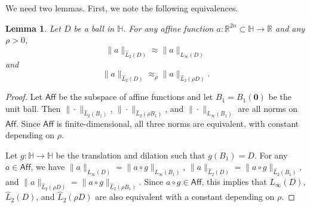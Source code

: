 \documentclass[12pt,reqno]{amsart}
\newcommand{\Aff}{\mathsf{Aff}}
\newcommand{\HH}{\mathbb{H}}
\newcommand{\R}{\mathbb{R}}
\newcommand{\zero}{\mathbf{0}}
\newcommand{\from}{\colon}
\newtheorem{lemma}[thm]{Lemma}
\theoremstyle{remark}
\newcommand{\0}{\mathbf{0}}
\renewcommand{\1}{\mathbf 1}
\begin{document}
We need two lemmas. First, we note the following equivalences.
\begin{lemma}\label{lem:affine-facts}
  Let $D$ be a ball in $\HH$. For any affine function $a\from \mathbb R^{2n}\subset \HH\to \R$ and any $\rho>0$,
  \begin{equation}\label{eqn:EquivalentNorms}
  \|a\|_{\widehat{L}_2(D)} \approx \|a\|_{L_\infty(D)}
  \end{equation}
  and
  \begin{equation}\label{eqn:EquivalentNorms2}
  \|a\|_{\widehat{L}_2(D)} \approx_\rho \|a\|_{\widehat{L}_2(\rho D)}.
  \end{equation}
\end{lemma}
\begin{proof}
  Let $\Aff$ be the subspace of affine functions and let $B_1=B_1(\zero)$ be the unit ball. Then $\|\cdot \|_{\widehat{L}_2(B_1)}$, $\|\cdot \|_{\widehat{L}_2(\rho B_1)}$, and $\|\cdot \|_{L_\infty(B_1)}$ are all norms on $\Aff$. Since $\Aff$ is finite-dimensional, all three norms are equivalent, with constant depending on $\rho$. 

  Let $g\from \HH\to \HH$ be the translation and dilation such that $g(B_1) = D$. For any $a\in \Aff$, we have
  $\|a\|_{L_\infty(D)} = \|a\circ g\|_{L_\infty(B_1)}$, $\|a\|_{\widehat{L}_2(D)} = \|a\circ g\|_{\widehat{L}_2(B_1)}$, and $\|a\|_{\widehat{L}_2(\rho D)} = \|a\circ g\|_{\widehat{L}_2(\rho B_1)}.$ Since $a\circ g \in \Aff$, this implies that $L_\infty(D)$, $\widehat{L}_2(D)$, and $\widehat{L}_2(\rho D)$ are also equivalent with a constant depending on $\rho$.
\end{proof}
\end{document}
